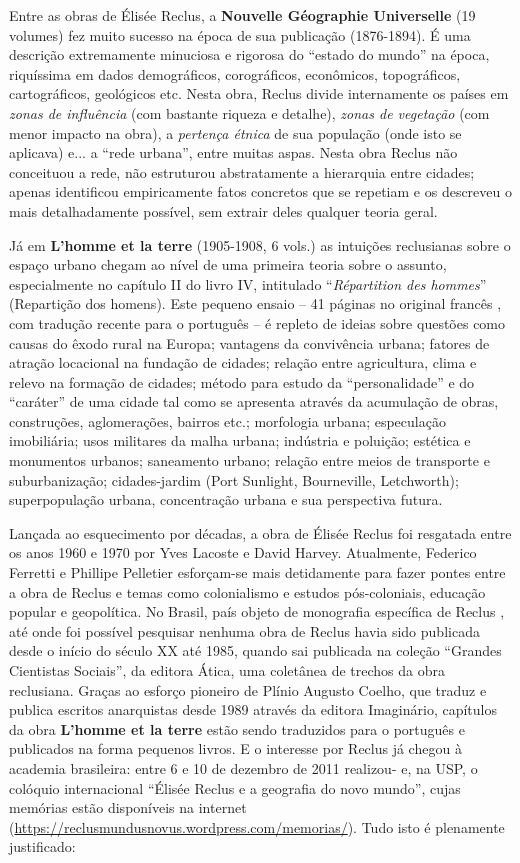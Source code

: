 Entre as obras de Élisée Reclus, a \textbf{Nouvelle Géographie Universelle }(19 volumes) fez muito sucesso na época de sua publicação (1876-1894). É uma descrição extremamente minuciosa e rigorosa do ``estado do mundo'' na época, riquíssima em dados demográficos, corográficos, econômicos, topográficos, cartográficos, geológicos etc. Nesta obra, Reclus divide internamente os países em \textit{zonas de influência }(com bastante riqueza e detalhe), \textit{zonas de vegetação }(com menor impacto na obra), a \textit{pertença étnica }de sua população (onde isto se aplicava) e... a ``rede urbana'', entre muitas aspas. Nesta obra Reclus não conceituou a rede, não estruturou abstratamente a hierarquia  entre cidades; apenas identificou empiricamente fatos concretos que se repetiam e os descreveu o mais detalhadamente possível, sem extrair deles qualquer teoria geral.

Já em \textbf{L'homme et la terre} (1905-1908, 6 vols.) as intuições reclusianas sobre o espaço urbano chegam ao nível de uma primeira teoria sobre o assunto, especialmente no capítulo II do livro IV, intitulado ``\textit{Répartition des hommes}'' (Repartição dos homens). Este pequeno ensaio -- 41 páginas no original francês \cite[pp.~335-376]{RECLUS1905e}, com tradução recente para o português \cite{reclus_renovacao_2010} -- é repleto de ideias sobre questões como causas do êxodo rural na Europa; vantagens da convivência urbana; fatores de atração locacional na fundação de cidades; relação entre agricultura, clima e relevo na formação de cidades; método para estudo da ``personalidade'' e do ``caráter'' de uma cidade tal como se apresenta através da acumulação de obras, construções, aglomerações, bairros etc.; morfologia urbana; especulação imobiliária; usos militares da malha urbana; indústria e poluição; estética e monumentos urbanos; saneamento urbano; relação entre meios de transporte e suburbanização; cidades-jardim (Port Sunlight, Bourneville, Letchworth); superpopulação urbana, concentração urbana e sua perspectiva futura.

Lançada ao esquecimento por décadas, a obra de Élisée Reclus foi resgatada entre os anos 1960 e 1970 por Yves Lacoste e David Harvey. Atualmente, Federico Ferretti e Phillipe Pelletier esforçam-se mais detidamente para fazer pontes entre a obra de Reclus e temas como colonialismo e estudos pós-coloniais, educação popular e geopolítica. No Brasil, país objeto de monografia específica de Reclus \cite{RECLUS1900}, até onde foi possível pesquisar nenhuma obra de Reclus havia sido publicada desde o início do século XX até 1985, quando sai publicada na coleção ``Grandes Cientistas Sociais'', da editora Ática, uma coletânea de trechos da obra reclusiana. Graças ao esforço pioneiro de Plínio Augusto Coelho, que traduz e publica escritos anarquistas desde 1989 através da editora Imaginário, capítulos da obra \textbf{L'homme et la terre }estão sendo traduzidos para o português e publicados na forma pequenos livros. E o interesse por Reclus já chegou à academia brasileira: entre 6 e 10 de dezembro de 2011 realizou- e, na USP, o colóquio internacional ``Élisée Reclus e a geografia do novo mundo'', cujas memórias estão disponíveis na internet (\url{https://reclusmundusnovus.wordpress.com/memorias/}). Tudo isto é plenamente justificado:

